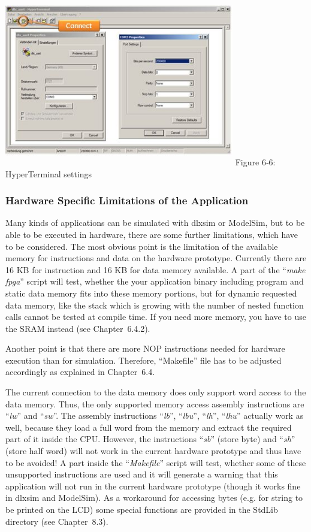 \documentclass[
]{article}
\begin{document}
\includegraphics[width=3.94849in,height=2.93699in]{6-6.png}
Figure 6‑6:\protect\hypertarget{Fig66}{}{} HyperTerminal settings

\hypertarget{hardware-specific-limitations-of-the-application}{%
\subsubsection{Hardware Specific Limitations of the
Application}\label{hardware-specific-limitations-of-the-application}}

Many kinds of applications can be simulated with dlxsim or ModelSim, but
to be able to be executed in hardware, there are some further
limitations, which have to be considered. The most obvious point is the
limitation of the available memory for instructions and data on the
hardware prototype. Currently there are 16 KB for instruction and 16 KB
for data memory available. A part of the ``\emph{make fpga}'' script
will test, whether the your application binary including program and
static data memory fits into these memory portions, but for dynamic
requested data memory, like the stack which is growing with the number
of nested function calls cannot be tested at compile time. If you need
more memory, you have to use the SRAM instead (see Chapter~6.4.2).

Another point is that there are more NOP instructions needed for
hardware execution than for simulation. Therefore, ``Makefile'' file has
to be adjusted accordingly as explained in Chapter~6.4.

The current connection to the data memory does only support word access
to the data memory. Thus, the only supported memory access assembly
instructions are ``\emph{lw}'' and ``\emph{sw}''. The assembly
instructions ``\emph{lb}'', ``\emph{lbu}'', ``\emph{lh}'',
``\emph{lhu}'' actually work as well, because they load a full word from
the memory and extract the required part of it inside the CPU. However,
the instructions ``\emph{sb}'' (store byte) and ``\emph{sh}'' (store
half word) will not work in the current hardware prototype and thus have
to be avoided! A part inside the ``\emph{Makefile}'' script will test,
whether some of these unsupported instructions are used and it will
generate a warning that this application will not run in the current
hardware prototype (though it works fine in dlxsim and ModelSim). As a
workaround for accessing bytes (e.g. for string to be printed on the
LCD) some special functions are provided in the StdLib directory (see
Chapter~8.3).
\end{document}
